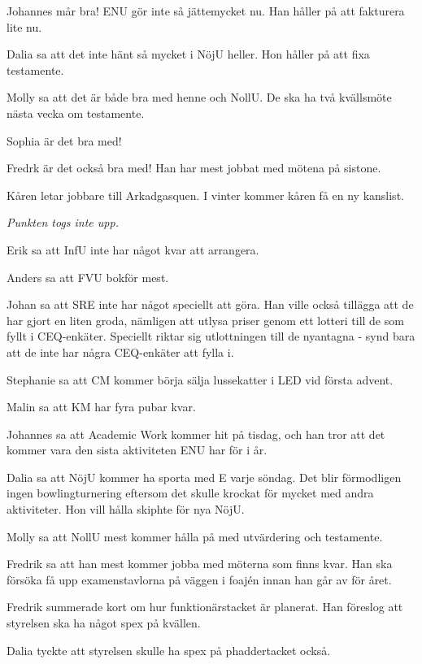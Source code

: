 \documentclass[10pt]{article}
\begin{document}
\begin{paragrafer}
\begin{paragrafer}
Johannes mår bra! ENU gör inte så jättemycket nu. Han håller på att fakturera lite nu.

Dalia sa att det inte hänt så mycket i NöjU heller. Hon håller på att fixa testamente.

Molly sa att det är både bra med henne och NollU. De ska ha två kvällsmöte nästa vecka om testamente.

Sophia är det bra med!

Fredrk är det också bra med! Han har mest jobbat med mötena på sistone.

Kåren letar jobbare till Arkadgasquen. I vinter kommer kåren få en ny kanslist.

\emph{Punkten togs inte upp.}

\end{paragrafer}

Erik sa att InfU inte har något kvar att arrangera.

Anders sa att FVU bokför mest.

Johan sa att SRE inte har något speciellt att göra. Han ville också tillägga att de har gjort en liten groda, nämligen att utlysa priser genom ett lotteri till de som fyllt i CEQ-enkäter. Speciellt riktar sig utlottningen till de nyantagna - synd bara att de inte har några CEQ-enkäter att fylla i.

Stephanie sa att CM kommer börja sälja lussekatter i LED vid första advent.

Malin sa att KM har fyra pubar kvar.

Johannes sa att Academic Work kommer hit på tisdag, och han tror att det kommer vara den sista aktiviteten ENU har för i år.

Dalia sa att NöjU kommer ha sporta med E varje söndag. Det blir förmodligen ingen bowlingturnering eftersom det skulle krockat för mycket med andra aktiviteter. Hon vill hålla skiphte för nya NöjU.

Molly sa att NollU mest kommer hålla på med utvärdering och testamente.

Fredrik sa att han mest kommer jobba med möterna som finns kvar. Han ska försöka få upp examenstavlorna på väggen i foajén innan han går av för året.

Fredrik summerade kort om hur funktionärstacket är planerat. Han föreslog att styrelsen ska ha något spex på kvällen.

Dalia tyckte att styrelsen skulle ha spex på phaddertacket också.


\end{paragrafer}
\end{document}
